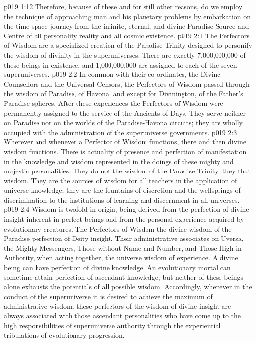 \vs p019 1:12 \pc Therefore, because of these and for still other reasons, do we employ the technique of approaching man and his planetary problems by embarkation on the time\hyp{}space journey from the infinite, eternal, and divine Paradise Source and Centre of all personality reality and all cosmic existence.
\vs p019 2:1 The Perfectors of Wisdom are a specialized creation of the Paradise Trinity designed to personify the wisdom of divinity in the superuniverses. There are exactly 7,000,000,000 of these beings in existence, and 1,000,000,000 are assigned to each of the seven superuniverses.
\vs p019 2:2 In common with their co\hyp{}ordinates, the Divine Counsellors and the Universal Censors, the Perfectors of Wisdom passed through the wisdom of Paradise, of Havona, and except for Divinington, of the Father’s Paradise spheres. After these experiences the Perfectors of Wisdom were permanently assigned to the service of the Ancients of Days. They serve neither on Paradise nor on the worlds of the Paradise\hyp{}Havona circuits; they are wholly occupied with the administration of the superuniverse governments.
\vs p019 2:3 \pc Wherever and whenever a Perfector of Wisdom functions, there and then divine wisdom functions. There is actuality of presence and perfection of manifestation in the knowledge and wisdom represented in the doings of these mighty and majestic personalities. They do not  the wisdom of the Paradise Trinity; they  that wisdom. They are the sources of wisdom for all teachers in the application of universe knowledge; they are the fountains of discretion and the wellsprings of discrimination to the institutions of learning and discernment in all universes.
\vs p019 2:4 Wisdom is twofold in origin, being derived from the perfection of divine insight inherent in perfect beings and from the personal experience acquired by evolutionary creatures. The Perfectors of Wisdom  the divine wisdom of the Paradise perfection of Deity insight. Their administrative associates on Uversa, the Mighty Messengers, Those without Name and Number, and Those High in Authority, when acting together,  the universe wisdom of experience. A divine being can have perfection of divine knowledge. An evolutionary mortal can sometime attain perfection of ascendant knowledge, but neither of these beings alone exhausts the potentials of all possible wisdom. Accordingly, whenever in the conduct of the superuniverse it is desired to achieve the maximum of administrative wisdom, these perfectors of the wisdom of divine insight are always associated with those ascendant personalities who have come up to the high responsibilities of superuniverse authority through the experiential tribulations of evolutionary progression.

